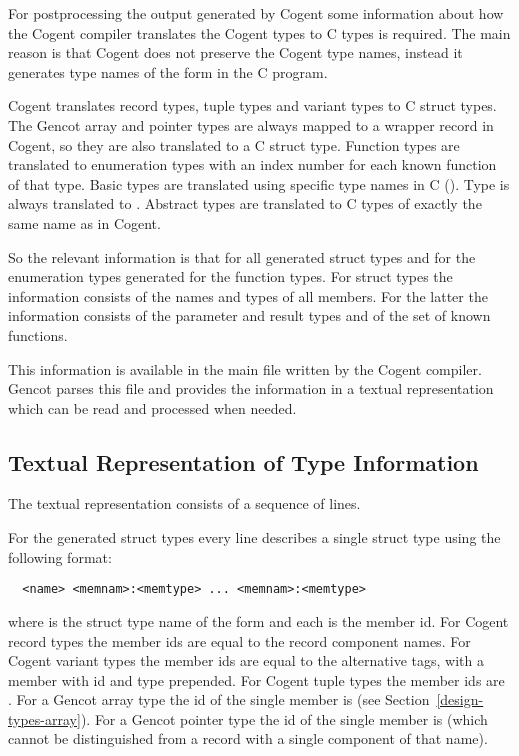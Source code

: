 For postprocessing the output generated by Cogent some information about how the Cogent compiler translates the 
Cogent types to C types is required. The main reason is that Cogent does not preserve the Cogent type names,
instead it generates type names of the form  in the C program.

Cogent translates record types, tuple types and variant types to C struct types. The Gencot array and pointer types are 
always mapped to a wrapper record in Cogent, so they are also translated to a C struct type. Function types 
are translated to enumeration types with an index number for each known function of that type. Basic types are
translated using specific type names in C (). Type  is
always translated to . Abstract types are translated to C types of exactly the same name as in Cogent.

So the relevant information is that for all generated struct types and for the enumeration types generated for 
the function types. For struct types the information consists of the names and types of all members. For the latter
the information consists of the parameter and result types and of the set of known functions.

This information is available in the main  file written by the Cogent compiler. Gencot parses this file 
and provides the information in a textual representation which can be read and processed when needed.

\subsection{Textual Representation of Type Information}
\label{impl-ctypinfo-repr}

The textual representation consists of a sequence of lines. 

For the generated struct types every line describes a single struct type using the following format:
\begin{verbatim}
  <name> <memnam>:<memtype> ... <memnam>:<memtype>
\end{verbatim}
where  is the struct type name of the form  and each  is the 
member id. For Cogent record types the member ids are equal to the record component names. For Cogent
variant types the member ids are equal to the alternative tags, with a member with id 
and type 
prepended. For Cogent tuple types the member ids are . For a Gencot array type
the id of the single member is  (see Section~\ref{design-types-array}). For a Gencot 
pointer type the id of the single member is  (which cannot be distinguished from a record 
with a single component of that name).

